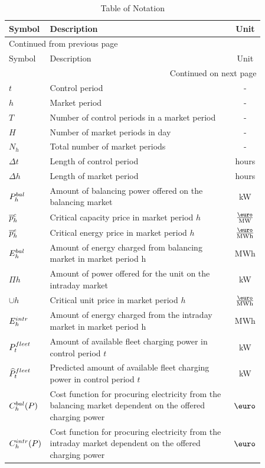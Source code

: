 \documentclass[a4paper, 12pt]{article}
\begin{document}
\begin{longtable}{p{0.11\linewidth}|p{0.75\linewidth}|c}
\caption[Table of Notation]{Table of Notation \label{table-notation}}
\\
\hline
\hline
Symbol & Description & Unit\\
\hline
\endfirsthead
\multicolumn{3}{l}{Continued from previous page} \\
\hline

Symbol & Description & Unit \\

\hline
\endhead
\hline\multicolumn{3}{r}{Continued on next page} \\
\endfoot
\endlastfoot
\hline
\(t\) & Control period & -\\
\(h\) & Market period & -\\
\(T\) & Number of control periods in a market period & -\\
\(H\) & Number of market periods in day & -\\
\(N_h\) & Total number of market periods & -\\
\(\Delta t\) & Length of control period & hours\\
\(\Delta h\) & Length of market period & hours\\
\hline
\(P^{bal}_{h}\) & Amount of balancing power offered on the balancing market & kW\\
\(\overline p^c_{h}\) & Critical capacity price in market period \(h\) & \(\emw\)\\
\(\overline p^e_{h}\) & Critical energy price in market period \(h\) & \(\emwh\)\\
\(E^{bal}_{h}\) & Amount of energy charged from balancing market in market period h & MWh\\
\(\Pi{h}\) & Amount of power offered for the unit on the intraday market & kW\\
\(\cup{h}\) & Critical unit price in market period \(h\) & \(\emwh\)\\
\(E^{intr}_{h}\) & Amount of energy charged from the intraday market in market period h & MWh\\
\hline
\(P^{fleet}_{t}\) & Amount of available fleet charging power in control period \(t\) & kW\\
\(\widehat{P}^{fleet}_{t}\) & Predicted amount of available fleet charging power in control period \(t\) & kW\\
\hline
\(C^{bal}_{h}(P)\) & Cost function for procuring electricity from the balancing market dependent on the offered charging power & \(\eur\)\\
\(C^{intr}_{h}(P)\) & Cost function for procuring electricity from the intraday market dependent on the offered charging power & \(\eur\)\\

\end{longtable}
\end{document}
